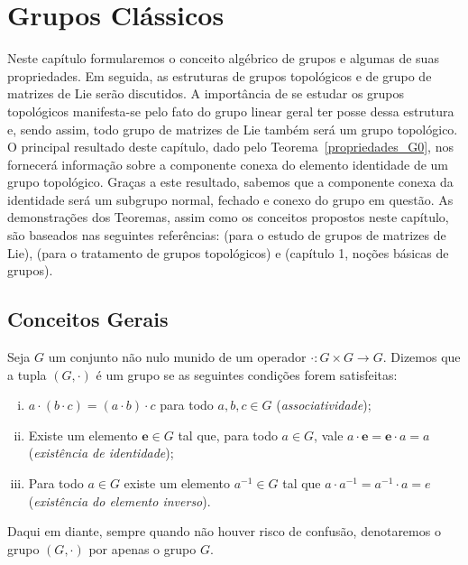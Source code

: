 \documentclass[twoside,openright,titlepage,numbers=noenddot,headinclude,  lineheaders footinclude=true,cleardoublepage=empty,
                                BCOR=5mm,paper=a4,fontsize=12pt ]{scrbook}
\theoremstyle{definition}
\newtheorem{exmp}{Exemplo}[section]
\begin{document}
\chapter{Grupos Cl\'assicos}
Neste capítulo formularemos o conceito algébrico de grupos e algumas de suas propriedades.
Em seguida, as estruturas de grupos topológicos e  de grupo de matrizes de Lie serão discutidos.
A importância de se estudar os grupos topológicos manifesta-se pelo fato do grupo linear geral
ter posse dessa estrutura e, sendo assim, todo grupo de matrizes de Lie também será um grupo topológico.
O principal resultado deste capítulo, dado pelo Teorema~\ref{propriedades_G0}, nos fornecerá informação
sobre a componente conexa do elemento identidade de um grupo topológico. Graças a este resultado,
sabemos que a componente conexa da identidade será um subgrupo normal, fechado e conexo do grupo em
questão. As demonstrações dos Teoremas, assim como os conceitos propostos neste capítulo,
são baseados nas seguintes referências: \cite{stillwell} (para o estudo de grupos de matrizes de Lie), 
\cite{kelley} (para o tratamento de grupos topológicos) e \cite{agozzine} (capítulo 1, noções básicas
de grupos).


\section{Conceitos Gerais} \label{sec:grupos}
Seja $G$ um conjunto não nulo munido de um operador $\cdot: G \times G \rightarrow G$. Dizemos que a tupla $(G, \cdot)$
é um grupo se as seguintes condições forem satisfeitas:
\begin{enumerate}[(i)]
   \item $a \cdot (b \cdot c) = (a \cdot b) \cdot c$ para todo $a, b, c \in G$ (\textit{associatividade});
   \item Existe um elemento $\mathbf{e} \in G$ tal que, para todo $a \in G$, vale $a \cdot \mathbf{e} = \mathbf{e} \cdot a = a$
   (\textit{existência de identidade});
   \item Para todo $a \in G$ existe um elemento $a^{-1} \in G$ tal que $a \cdot a^{-1} = a^{-1} \cdot a = e$
   (\textit{existência do elemento inverso}).
\end{enumerate}
Daqui em diante, sempre quando não houver risco de confusão, denotaremos o grupo $(G, \cdot)$ por apenas o grupo $G$.

\end{document}
